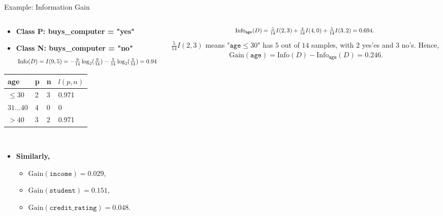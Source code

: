 \begin{frame}{Example: Information Gain}
	\begin{columns}
		\begin{column}{0.45\textwidth}
			\vspace*{-2em}
			\begin{itemize}
				\item \textbf{Class P: buys\_computer = "yes"}
				\item \textbf{Class N: buys\_computer = "no"}
				      \begin{align*}
					      \resizebox{7cm}{!}{%
						      $\text{Info}(D) = I(9,5) = - \frac{9}{14}\log_2(\frac{9}{14})-\frac{5}{14} \log_2(\frac{5}{14}) = 0.94$
					      }
				      \end{align*}
			\end{itemize}
			\centering
			\begin{tabular}{|l|l|l|l|}
				\hline
				\cellcolor{faugray!62}age     & \cellcolor{faugray!62}p & \cellcolor{faugray!62}n & \cellcolor{faugray!62}$l(p,n)$ \\\hline
				\cellcolor{white}$\leq 30$    & 2                       & 3                       & 0.971                          \\\hline
				\cellcolor{white}$31\ldots40$ & 4                       & 0                       & 0                              \\\hline
				\cellcolor{white}$>40$        & 3                       & 2                       & 0.971                          \\\hline
			\end{tabular}\\[0.2cm]
			\begin{itemize}
				\item \textbf{Similarly,}
				      \begin{itemize}
					      \item $\text{Gain}(\texttt{income}) = 0.029$,
					      \item $\text{Gain}(\texttt{student}) = 0.151$,
					      \item $\text{Gain}(\texttt{credit\_rating}) = 0.048$.
				      \end{itemize}
			\end{itemize}
		\end{column}
		\begin{column}{0.45\textwidth}
			\vspace{-1.3cm}
			\begin{align*}
				\resizebox{7cm}{!}{%
				$\text{Info}_{\texttt{age}}(D) = \frac{5}{14}I(2,3) + \frac{4}{14} I(4,0) + \frac{5}{14} I(3,2) = 0.694$.
				}
			\end{align*}
			$\frac{5}{14} I(2,3)$ means "$\texttt{age} \leq 30$" has $5$ out of $14$ samples, with $2$ yes'es and $3$ no's. Hence,
			\vspace*{-.5em}
			\begin{align*}
				\text{Gain}(\texttt{age}) = \text{Info}(D)-\text{Info}_{\texttt{age}}(D) = 0.246.
			\end{align*}


\end{column}
\end{columns}
\end{frame}
